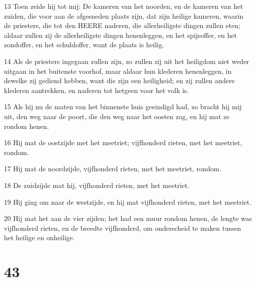 \par 13 Toen zeide hij tot mij: De kameren van het noorden, en de kameren van het zuiden, die voor aan de afgesneden plaats zijn, dat zijn heilige kameren, waarin de priesters, die tot den HEERE naderen, die allerheiligste dingen zullen eten; aldaar zullen zij de allerheiligste dingen henenleggen, en het spijsoffer, en het zondoffer, en het schuldoffer, want de plaats is heilig.
\par 14 Als de priesters ingegaan zullen zijn, zo zullen zij uit het heiligdom niet weder uitgaan in het buitenste voorhof, maar aldaar hun klederen henenleggen, in dewelke zij gediend hebben, want die zijn een heiligheid; en zij zullen andere klederen aantrekken, en naderen tot hetgeen voor het volk is.
\par 15 Als hij nu de maten van het binnenste huis geeindigd had, zo bracht hij mij uit, den weg naar de poort, die den weg naar het oosten zag, en hij mat ze rondom henen.
\par 16 Hij mat de oostzijde met het meetriet; vijfhonderd rieten, met het meetriet, rondom.
\par 17 Hij mat de noordzijde, vijfhonderd rieten, met het meetriet, rondom.
\par 18 De zuidzijde mat hij, vijfhonderd rieten, met het meetriet.
\par 19 Hij ging om naar de westzijde, en hij mat vijfhonderd rieten, met het meetriet.
\par 20 Hij mat het aan de vier zijden; het had een muur rondom henen, de lengte was vijfhonderd rieten, en de breedte vijfhonderd, om onderscheid te maken tussen het heilige en onheilige.

\chapter{43}

